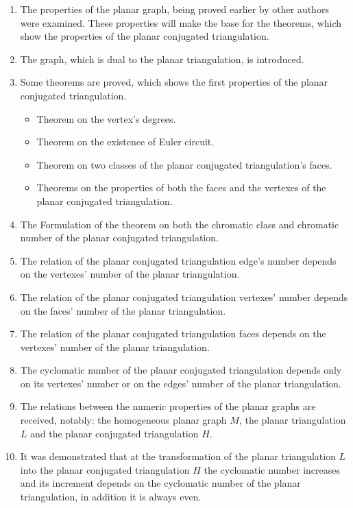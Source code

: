 \documentclass{amsart}
\theoremstyle{plain}
\numberwithin{equation}{section}
\begin{document}
\begin{enumerate}
\item	
The properties of the planar graph, being proved earlier by other authors were examined. These properties will make the base for the theorems, which show the properties of the planar conjugated triangulation.
\item	
The graph, which is dual to the planar triangulation, is introduced.
\item	
Some theorems are proved, which shows the first properties of the planar conjugated triangulation.

\begin {itemize}
\item	
Theorem on the vertex's degrees.
\item	
Theorem on the existence of Euler circuit.
\item	
Theorem on two classes of the planar conjugated triangulation's faces.
\item	
Theorems on the properties of both the faces and the vertexes of the planar conjugated triangulation.
\end{itemize}
	
\item	
The Formulation of the theorem on both the chromatic class and chromatic number of the planar conjugated triangulation.

\item	
The relation of the planar conjugated triangulation edge's number depends on the vertexes' number of the planar triangulation.
	
\item	
The relation of the planar conjugated triangulation vertexes' number depends on the faces' number of the planar triangulation.
	
\item	
The relation of the planar conjugated triangulation faces depends on the vertexes' number of the planar triangulation.
	
\item	
The cyclomatic number of the planar conjugated triangulation depends only on its vertexes' number or on the edges' number of the planar triangulation.

\item 
The relations between the numeric properties of the planar graphs are received, notably: the homogeneous planar graph $M$, the planar triangulation $L$ and the planar conjugated triangulation $H$.

\item 
It was demonstrated that at the transformation of the planar triangulation $L$ into the planar conjugated triangulation $H$ the cyclomatic number increases and its increment depends on the cyclomatic number of the planar triangulation, in addition it is always even.


\end{enumerate}
\end{document}
